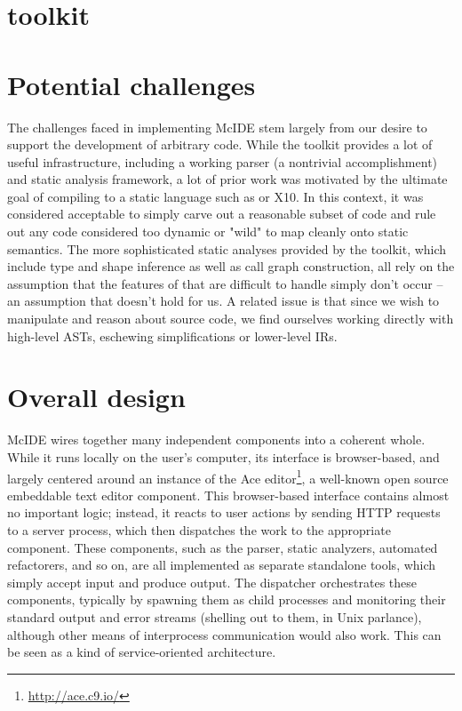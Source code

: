 \section{\mclab toolkit}

\section{Potential challenges}

The challenges faced in implementing McIDE stem largely from our desire to
support the development of arbitrary \matlab code. While the \mclab toolkit
provides a lot of useful infrastructure, including a working \matlab parser (a
nontrivial accomplishment) and static analysis framework, a lot of prior work
was motivated by the ultimate goal of compiling \matlab to a static language
such as \fortran or X10. In this context, it was considered acceptable to
simply carve out a reasonable subset of \matlab code and rule out any code
considered too dynamic or "wild" to map cleanly onto static semantics. The more
sophisticated static analyses provided by the \mclab toolkit, which include
type and shape inference as well as call graph construction, all rely on the
assumption that the features of \matlab that are difficult to handle simply
don't occur -- an assumption that doesn't hold for us. A related issue is that
since we wish to manipulate and reason about \matlab source code, we find
ourselves working directly with high-level ASTs, eschewing simplifications or
lower-level IRs.

\section{Overall design}


McIDE wires together many independent components into a coherent whole. While
it runs locally on the user's computer, its interface is browser-based, and
largely centered around an instance of the Ace
editor\footnote{\url{http://ace.c9.io/}}, a well-known open source embeddable
text editor component. This browser-based interface contains almost no
important logic; instead, it reacts to user actions by sending HTTP requests to
a server process, which then dispatches the work to the appropriate component.
These components, such as the parser, static analyzers, automated refactorers,
and so on, are all implemented as separate standalone tools, which simply
accept input and produce output. The dispatcher orchestrates these components,
typically by spawning them as child processes and monitoring their standard
output and error streams (shelling out to them, in Unix parlance), although
other means of interprocess communication would also work. This can be seen as
a kind of service-oriented architecture.

